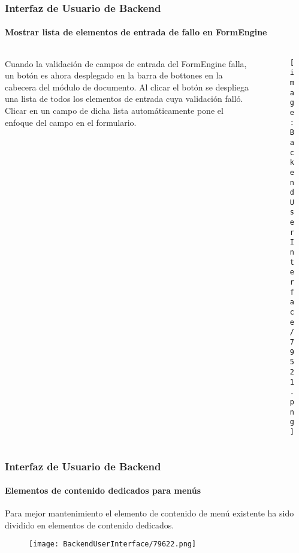 \begin{frame}[fragile]
	\frametitle{Interfaz de Usuario de Backend}
	\framesubtitle{Mostrar lista de elementos de entrada de fallo en FormEngine}

	\begin{columns}[T]
		\begin{column}{.35\textwidth}
			Cuando la validación de campos de entrada del FormEngine falla, un botón es ahora desplegado en
			la barra de bottones en la cabecera del módulo de documento. Al clicar el botón se despliega una lista de
			todos los elementos de entrada cuya validación falló. Clicar en un campo de dicha lista
			automáticamente pone el enfoque del campo en el formulario.
		\end{column}

		\begin{column}{.65\textwidth}
			\begin{figure}\vspace*{-0.6cm}
				\texttt{[image: BackendUserInterface/79521.png]}
			\end{figure}
		\end{column}
	\end{columns}

\end{frame}

\begin{frame}[fragile]
	\frametitle{Interfaz de Usuario de Backend}
	\framesubtitle{Elementos de contenido dedicados para menús}

	Para mejor mantenimiento el elemento de contenido de menú existente ha sido
	dividido en elementos de contenido dedicados.

	\begin{figure}\vspace{-0.2cm}
		\texttt{[image: BackendUserInterface/79622.png]}
	\end{figure}

\end{frame}

